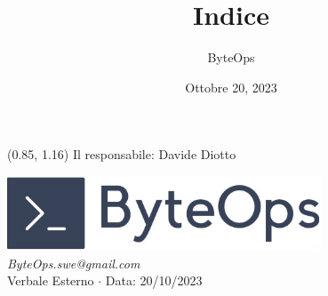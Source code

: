 \documentclass{article}
\title{\textbf{\fontsize{28}{6}\selectfont Indice}}
\author{\fontsize{14}{6}\selectfont ByteOps}
\date{Ottobre 20, 2023}
\begin{document}
\begin{textblock*}{\textwidth}(0.85\textwidth, 1.16\textheight)
    Il responsabile: Davide Diotto
\end{textblock*}

\pagestyle{fancy}
\begin{center}
\includegraphics[width = 0.7\textwidth]{../../../Images/logo.png} \\
\vspace{0.2cm}
\textcolor[RGB]{60, 60, 60}{\textit{ByteOps.swe@gmail.com}} \\
\vspace{1cm}
\fontsize{16}{6}\selectfont Verbale Esterno $\cdot$ Data: 20/10/2023 \\
\vspace{0.5cm}
\end{center}
\end{document}
